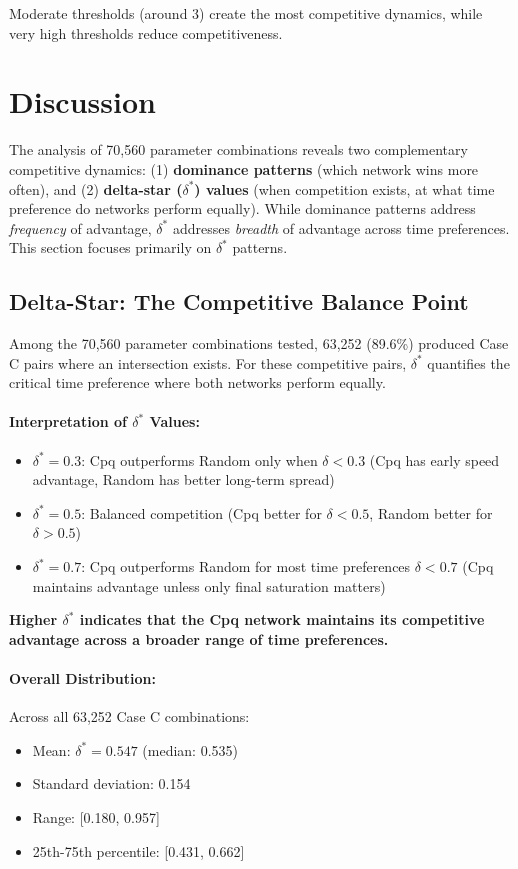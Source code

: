 \documentclass[12pt,a4paper]{article}
\begin{document}
Moderate thresholds (around 3) create the most competitive dynamics, while very high thresholds reduce competitiveness.

\section{Discussion}

The analysis of 70,560 parameter combinations reveals two complementary competitive dynamics: (1) \textbf{dominance patterns} (which network wins more often), and (2) \textbf{delta-star ($\delta^*$) values} (when competition exists, at what time preference do networks perform equally). While dominance patterns address \textit{frequency} of advantage, $\delta^*$ addresses \textit{breadth} of advantage across time preferences. This section focuses primarily on $\delta^*$ patterns.

\subsection{Delta-Star: The Competitive Balance Point}

Among the 70,560 parameter combinations tested, 63,252 (89.6\%) produced Case C pairs where an intersection exists. For these competitive pairs, $\delta^*$ quantifies the critical time preference where both networks perform equally.

\paragraph{Interpretation of $\delta^*$ Values:}
\begin{itemize}
    \item $\delta^* = 0.3$: Cpq outperforms Random only when $\delta < 0.3$ (Cpq has early speed advantage, Random has better long-term spread)
    \item $\delta^* = 0.5$: Balanced competition (Cpq better for $\delta < 0.5$, Random better for $\delta > 0.5$)
    \item $\delta^* = 0.7$: Cpq outperforms Random for most time preferences $\delta < 0.7$ (Cpq maintains advantage unless only final saturation matters)
\end{itemize}

\textbf{Higher $\delta^*$ indicates that the Cpq network maintains its competitive advantage across a broader range of time preferences.}

\paragraph{Overall Distribution:}
Across all 63,252 Case C combinations:
\begin{itemize}
    \item Mean: $\delta^* = 0.547$ (median: 0.535)
    \item Standard deviation: 0.154
    \item Range: [0.180, 0.957]
    \item 25th-75th percentile: [0.431, 0.662]
\end{itemize}
\end{document}

